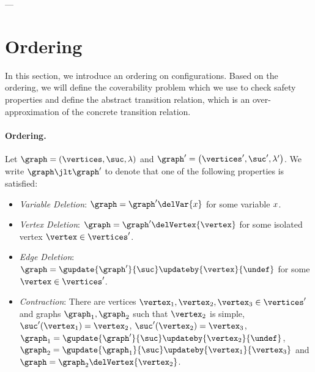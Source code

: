 ---%
\section{Ordering}
\label{section:orderings}
In this section, we introduce an ordering on configurations.
%
Based on the ordering, we will define the coverability problem
which we use to check safety properties and
define the abstract transition relation, which is an over-approximation
of the concrete transition relation.


\paragraph{\bf Ordering.} 
Let $\graph=\tuple{\vertices,\suc,\labeling}$ and
$\graph'=\tuple{\vertices',\suc',\labeling'}$.
%
We write $\graph\jlt\graph'$ to
denote that one of the following properties is satisfied:
%
\begin{itemize}
\item %
  {\it Variable Deletion}: %
  $\graph=\graph'\delVar{\xvar}$ for some variable $x$.
\item %
  {\it Vertex Deletion}: %
  $\graph=\graph'\delVertex{\vertex}$ for some isolated vertex
  $\vertex\in\vertices'$.
\item %
  {\it Edge Deletion}: %
  $\graph=\gupdate{\graph'}{\suc}\updateby{\vertex}{\undef}$ for some
  $\vertex\in\vertices'$.
\item %
  {\it Contraction}: %
  There are vertices $\vertex_1,\vertex_2,\vertex_3\in\vertices'$ and
  graphs $\graph_1,\graph_2$ such that $\vertex_2$ is simple,
  $\suc'(\vertex_1)=\vertex_2$, $\suc'(\vertex_2)=\vertex_3$,
  $\graph_1=\gupdate{\graph'}{\suc}\updateby{\vertex_2}{\undef}$,
  $\graph_2=\gupdate{\graph_1}{\suc}\updateby{\vertex_1}{\vertex_3}$
  and $\graph=\graph_2\delVertex{\vertex_2}$.
\end{itemize}
